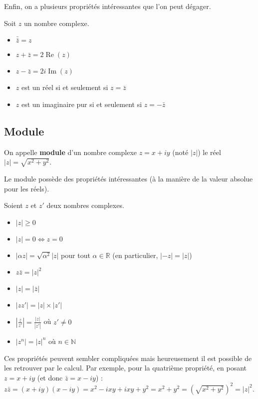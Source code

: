 	Enfin, on a plusieurs propriétés intéressantes que l'on peut dégager.

	\begin{formula}[Propriétés]
		Soit $z$ un nombre complexe.
		\begin{itemize}
			\item $\bar{\bar{z}} = z$
			\item $z + \bar{z} = 2 \operatorname{Re}(z)$
			\item $z - \bar{z} = 2i \operatorname{Im}(z)$
			\item $z$ est un réel si et seulement si $z = \bar{z}$
			\item $z$ est un imaginaire pur si et seulement si $z = -\bar{z}$
		\end{itemize}
	\end{formula}

	\subsection{Module}
	\label{module}

	\begin{formula}[Définition]
		On appelle \textbf{module} d'un nombre complexe $z = x + iy$ (noté $|z|$) le réel $|z| = \sqrt{x^2 + y^2}$.
	\end{formula}

	Le module possède des propriétés intéressantes (à la manière de la valeur absolue pour les réels).

	\begin{formula}[Formules]
		Soient $z$ et $z'$ deux nombres complexes.
		\begin{itemize}
			\item $|z| \geq 0$
			\item $|z| = 0 \iff z = 0$
			\item $|\alpha z| = \sqrt{\alpha^2} |z|$ pour tout $\alpha \in \mathbb{R}$ (en particulier, $|-z| = |z|$)
			\item $z\bar{z} = |z|^2$
			\item $|z| = |\bar{z}|$
			\item $|zz'| = |z| \times |z'|$
			\item $\left|\frac{z}{z'}\right| = \frac{|z|}{|z'|}$ où $z' \neq 0$
			\item $|z^n| = |z|^n$ où $n \in \mathbb{N}$
		\end{itemize}
	\end{formula}

	\begin{tip}
		Ces propriétés peuvent sembler compliquées mais heureusement il est possible de les retrouver par le calcul. Par exemple, pour la quatrième propriété, en posant $z = x+iy$ (et donc $\bar{z} = x-iy$) :
		\newpar
		$z\bar{z} = (x+iy)(x-iy) = x^2 - ixy + ixy + y^2 = x^2 + y^2 = \left(\sqrt{x^2 + y^2}\right)^2 = |z|^2$.
	\end{tip}

